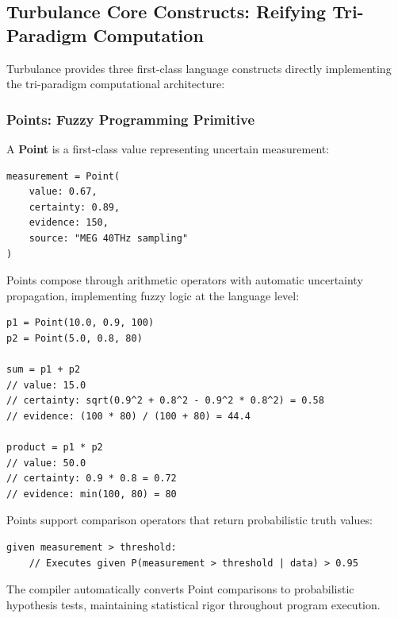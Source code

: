\subsection{Turbulance Core Constructs: Reifying Tri-Paradigm Computation}

Turbulance provides three first-class language constructs directly implementing the tri-paradigm computational architecture:

\subsubsection{Points: Fuzzy Programming Primitive}

\begin{definition}
A \textbf{Point} is a first-class value representing uncertain measurement:
\begin{verbatim}
measurement = Point(
    value: 0.67,
    certainty: 0.89,
    evidence: 150,
    source: "MEG 40THz sampling"
)
\end{verbatim}
\end{definition}

\begin{theorem}
\label{thm:point_arithmetic}
Points compose through arithmetic operators with automatic uncertainty propagation, implementing fuzzy logic at the language level:

\begin{verbatim}
p1 = Point(10.0, 0.9, 100)
p2 = Point(5.0, 0.8, 80)

sum = p1 + p2
// value: 15.0
// certainty: sqrt(0.9^2 + 0.8^2 - 0.9^2 * 0.8^2) = 0.58
// evidence: (100 * 80) / (100 + 80) = 44.4

product = p1 * p2
// value: 50.0
// certainty: 0.9 * 0.8 = 0.72
// evidence: min(100, 80) = 80
\end{verbatim}
\end{theorem}

\begin{proposition}
Points support comparison operators that return probabilistic truth values:
\begin{verbatim}
given measurement > threshold:
    // Executes given P(measurement > threshold | data) > 0.95
\end{verbatim}

The compiler automatically converts Point comparisons to probabilistic hypothesis tests, maintaining statistical rigor throughout program execution.
\end{proposition}

